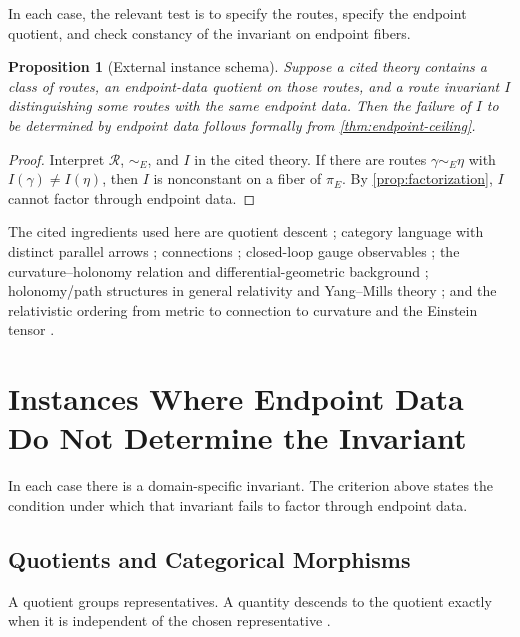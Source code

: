 \documentclass[12pt]{article}
\newtheorem{proposition}[proposition]{Proposition}
\newcommand{\calR}{\mathcal{R}}
\newcommand{\citep}[1]{\cite{#1}}
\begin{document}
In each case, the relevant test is to specify the routes, specify the
endpoint quotient, and check constancy of the invariant on endpoint
fibers.

\begin{proposition}[External instance schema]
\label{prop:external-schema}
Suppose a cited theory contains a class of routes, an endpoint-data
quotient on those routes, and a route invariant $I$ distinguishing some
routes with the same endpoint data. Then the failure of $I$ to be
determined by endpoint data follows formally from
\cref{thm:endpoint-ceiling}.
\end{proposition}

\begin{proof}
Interpret $\calR$, $\sim_E$, and $I$ in the cited theory. If there are
routes $\gamma\sim_E\eta$ with $I(\gamma)\neq I(\eta)$, then $I$ is
nonconstant on a fiber of $\pi_E$. By \cref{prop:factorization}, $I$
cannot factor through endpoint data.
\end{proof}

The cited ingredients used here are quotient descent
\citep{Munkres2000}; category
language with distinct parallel arrows
\citep{EilenbergMacLane1945,MacLane1998}; connections \citep{Ehresmann1950};
closed-loop gauge observables \citep{Wilson1974}; the curvature--holonomy
relation and differential-geometric background
\citep{AmbroseSinger1953,KobayashiNomizu1963}; holonomy/path structures in
general relativity and Yang--Mills theory \citep{Barrett1991}; and the
relativistic ordering from metric to connection to curvature and the Einstein
tensor \citep{Wald1984,Malament2012,Carroll2019}.

\section{Instances Where Endpoint Data Do Not Determine the Invariant}
\label{sec:realizations}

In each case there is a domain-specific invariant. The criterion above
states the condition under which that invariant fails to factor through
endpoint data.

\subsection{Quotients and Categorical Morphisms}
\label{subsec:quotients-categories}

A quotient groups representatives. A quantity descends to the
quotient exactly when it is independent of the chosen representative
\citep{Munkres2000}.
\end{document}
